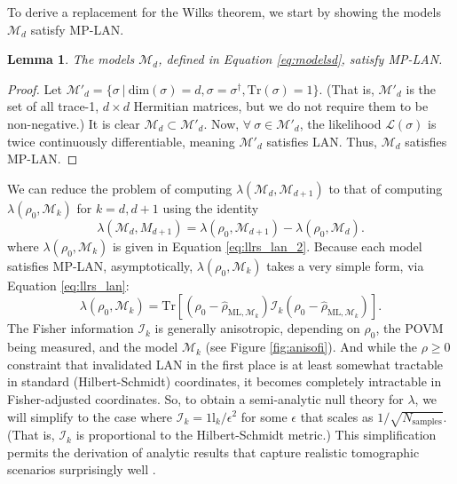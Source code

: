 \documentclass[aps,pra, twocolumn]{revtex4-1}
\newcommand{\M}{\mathcal{M}}
\newcommand{\cL}{\mathcal{L}}
\newcommand{\Id}{\mathbb{I}}
\def\Id{1\!\mathrm{l}}
\newcommand{\rhohat}{\hat{\rho}}
\newcommand{\rhoML}[1]{\rhohat_{\scriptscriptstyle{\mathrm{ML},#1}}}
\newtheorem{lem}{Lemma}
\begin{document}
To derive a replacement for the Wilks theorem, we start by showing  the models $\M_{d}$ satisfy MP-LAN.
\begin{lem}
\label{lem:qlan}
The models $\M_{d}$, defined in Equation \eqref{eq:modelsd}, satisfy MP-LAN.
\end{lem}

\begin{proof} Let $\M'_{d} = \{\sigma ~|~\mathrm{dim}(\sigma) = d, \sigma = \sigma^{\dagger}, \mathrm{Tr}(\sigma)=1\}$. (That is, $\M'_{d}$ is the set of all trace-1, $d \times d$ Hermitian matrices, but we do not require them to be non-negative.) It is clear $\M_{d} \subset \M'_{d}$. Now, $\forall ~\sigma \in \M'_{d}$, the likelihood $\cL(\sigma)$ is twice continuously differentiable, meaning $\M'_{d}$ satisfies LAN. Thus, $\M_{d}$ satisfies MP-LAN.
\end{proof}

We can reduce the problem of computing $\lambda(\M_{d}, \M_{d+1})$ to that of computing $\lambda(\rho_{0}, \M_{k})$ for $k = d, d+1$ using the identity
\[\lambda(\M_{d}, M_{d+1}) = \lambda(\rho_{0}, \M_{d+1}) - \lambda(\rho_{0}, \M_{d}).\]
where $\lambda(\rho_{0}, \M_{k})$ is given in Equation \eqref{eq:llrs_lan_2}.
Because each model satisfies MP-LAN, asymptotically, $\lambda(\rho_{0}, \M_{k})$ takes a very simple form, via Equation \eqref{eq:llrs_lan}:
\[\lambda(\rho_{0}, \M_{k}) = \mathrm{Tr}[(\rho_{0} - \rhoML{\M_{k}})\mathcal{I}_{k}(\rho_{0} - \rhoML{\M_{k}})].\]
The Fisher information $\mathcal{I}_{k}$ is generally anisotropic,  depending on $\rho_{0}$, the POVM being measured, and the model $\M_{k}$ (see Figure \ref{fig:anisofi}). And while the $\rho\geq0$ constraint  that invalidated LAN in the first place is at least somewhat tractable in standard (Hilbert-Schmidt) coordinates, it becomes completely intractable in Fisher-adjusted coordinates.  So, to obtain a semi-analytic null theory for $\lambda$, we will simplify to the case where   $\mathcal{I}_{k} = \Id_{k}/\epsilon^{2} $ for some $\epsilon$ that scales as $1/\sqrt{N_{\mathrm{samples}}}$. (That is, $\mathcal{I}_{k}$ is proportional to the Hilbert-Schmidt metric.) This simplification permits the derivation of analytic results that capture realistic tomographic scenarios surprisingly well \cite{Smolin2012}.
\end{document}
